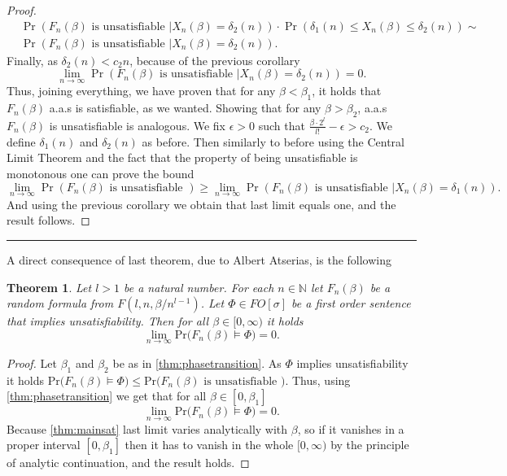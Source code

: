 \documentclass[12pt,notitlepage,a4paper]{article}
\newtheorem{theorem}{Theorem}[section]
\theoremstyle{definition}
\newcommand{\N}{\mathbb{N}}
\newcommand{\Ln}{\lim\limits_{n\to \infty}}
\newcommand{\PR}[1]{\mathrm{Pr}\big(#1\big)}
\newcommand{\sep}{\noindent\rule{2cm}{0.4pt}}
\begin{document}
\begin{proof}
	\begin{align*}
	&\Pr \left(
	F_n(\beta) \text{ is unsatisfiable } \Big|
	X_n(\beta)=\delta_2(n) \right) \cdot 
	\Pr\left( \delta_1(n) \leq X_n(\beta)  
	\leq \delta_2(n)  \right)\sim\\&
	\Pr \left(
	F_n(\beta) \text{ is unsatisfiable } \Big|
	X_n(\beta)=\delta_2(n) \right).
	\end{align*}
	Finally, as $\delta_2(n)< c_2n$, because of the previous
	corollary
	\[
	\Ln \Pr \left(
	F_n(\beta) \text{ is unsatisfiable } \Big|
	X_n(\beta)=\delta_2(n) \right)= 0.
	\]  
	Thus, joining everything, we have proven that for any 
	$\beta < \beta_1$, it holds that
	$F_n(\beta)$ a.a.s is satisfiable, as we wanted.
	Showing that for any $\beta > \beta_2$, 
	a.a.s $F_n(\beta)$ is unsatisfiable is analogous. We
	fix $\epsilon>0$ such that $\frac{\beta\cdot 2^l}{l!}-\epsilon>c_2$.
	We define $\delta_1(n)$ and $\delta_2(n)$ as before. Then similarly to before 
	using the Central Limit Theorem and the fact that
	the property of being unsatisfiable is monotonous one can prove the bound
	\[
	\Ln \Pr \left(
	F_n(\beta) \text{ is unsatisfiable } \right) \geq
	\Ln \Pr \left(
	F_n(\beta) \text{ is unsatisfiable } \Big|
	X_n(\beta)=\delta_1(n) \right).
	\]
	And using the previous corollary we obtain that last limit equals one, 
	and the result follows. 
	
\end{proof}
\sep

A direct consequence of last theorem, due to Albert Atserias, is the following

\begin{theorem} \label{thm:satapplication}
	Let $l>1$ be a natural number.
	For each $n\in \N$ let $F_n(\beta)$ be a random formula from
	$F(l,n,\beta/n^{l-1})$. Let $\Phi\in FO[\sigma]$ be a first order
	sentence that implies unsatisfiability.  Then for all $\beta\in [0,\infty)$
	it holds
	\[
	\Ln \PR{F_n(\beta)\models \Phi  }=0.
	\]
\end{theorem}
\begin{proof}
	Let $\beta_1$ and $\beta_2$ be as in \cref{thm:phasetransition}. 
	As $\Phi$ implies unsatisfiability it holds
	$\PR{F_n(\beta)\models \Phi  }\leq  
	\PR{F_n(\beta) \text{ is unsatisfiable }  }$. Thus, using \cref{thm:phasetransition}
	we get that for all $\beta\in [0,\beta_1]$
	\[
	\Ln \PR{F_n(\beta)\models \Phi  }=0.
	\]
	Because \cref{thm:mainsat} last limit varies analytically with $\beta$, so
	if it vanishes in a proper interval $[0,\beta_1]$ then it has to vanish
	in the whole $[0,\infty)$ by the principle of analytic continuation, and the result 
	holds. 
\end{proof}
\end{document}
